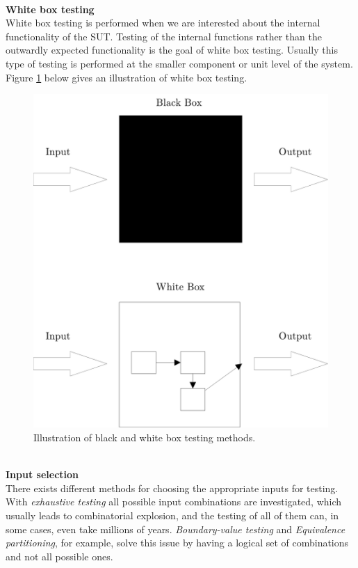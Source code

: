 \documentclass[english,12pt,a4paper,pdftex,elec,utf8]{aaltothesis}
\begin{document}
\\
\textbf{White box testing}\\ 
White box testing is performed when we are interested about the internal functionality of the SUT. Testing of the internal functions rather than the outwardly expected functionality is the goal of white box testing. Usually this type of testing is performed at the smaller component or unit level of the system. Figure \ref{boxfigurespuge} below gives an illustration of white box testing. \cite{artofsofttesting}\\
\begin{figure}[h!]
\centering
\includegraphics[scale=0.4]{whiteblackbox}
\caption{Illustration of black and white box testing methods. \cite{artofsofttesting}}
\label{boxfigurespuge}
\end{figure} 
\\
\textbf{Input selection}\\
There exists different methods for choosing the appropriate inputs for testing. With \textit{exhaustive testing} all possible input combinations are investigated, which usually leads to combinatorial explosion, and the testing of all of them can, in some cases, even take millions of years. \textit{Boundary-value testing} and \textit{Equivalence partitioning}, for example, solve this issue by having a logical set of combinations and not all possible ones. \cite{artofsofttesting}\par 
\end{document}
